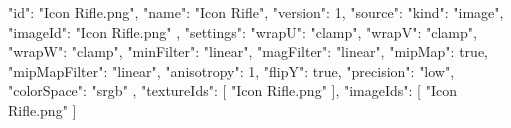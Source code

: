 {
  "id": "Icon Rifle.png",
  "name": "Icon Rifle",
  "version": 1,
  "source": {
    "kind": "image",
    "imageId": "Icon Rifle.png"
  },
  "settings": {
    "wrapU": "clamp",
    "wrapV": "clamp",
    "wrapW": "clamp",
    "minFilter": "linear",
    "magFilter": "linear",
    "mipMap": true,
    "mipMapFilter": "linear",
    "anisotropy": 1,
    "flipY": true,
    "precision": "low",
    "colorSpace": "srgb"
  },
  "textureIds": [
    "Icon Rifle.png"
  ],
  "imageIds": [
    "Icon Rifle.png"
  ]
}

